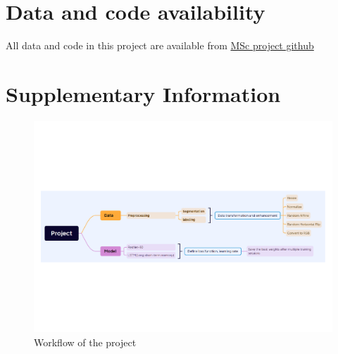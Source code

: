 \documentclass[11pt,a4paper]{article}
\begin{document}
\begin{spacing}{1.5}
\newpage

\section*{Data and code availability}
All data and code in this project are available from \href {https://github.com/Midsummer874/CMEECourseWork/tree/master/MScProject} {MSc project github}





\pagebreak

\section*{Supplementary Information}

\begin{figure}[ht]
	\centering
	\includegraphics[scale=0.4]{workflow.pdf}
	\caption{Workflow of the project}
	\label{workflow}
\end{figure}

\end{spacing}
\end{document}
